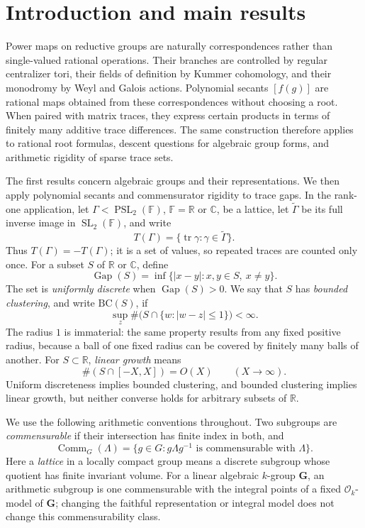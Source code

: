 \documentclass[11pt,reqno]{amsart}
\theoremstyle{definition}
\theoremstyle{remark}
\newcommand{\R}{\mathbb R}
\newcommand{\C}{\mathbb C}
\newcommand{\F}{\mathbb F}
\newcommand{\cO}{\mathcal O}
\newcommand{\Tr}{\operatorname{tr}}
\newcommand{\Gap}{\operatorname{Gap}}
\newcommand{\Comm}{\operatorname{Comm}}
\newcommand{\SL}{\operatorname{SL}}
\newcommand{\PSL}{\operatorname{PSL}}
\newcommand{\BC}{\mathrm{BC}}
\begin{document}
\maketitle
\tableofcontents

\section{Introduction and main results}

Power maps on reductive groups are naturally correspondences rather than
single-valued rational operations.  Their branches are controlled by regular
centralizer tori, their fields of definition by Kummer cohomology, and their
monodromy by Weyl and Galois actions.  Polynomial secants \([f(g)]\) are
rational maps obtained from these correspondences without choosing a root.
When paired with matrix traces, they express certain products in terms of
finitely many additive trace differences.  The same construction therefore
applies to rational root formulas, descent questions for algebraic group
forms, and arithmetic rigidity of sparse trace sets.

The first results concern algebraic groups and their representations.  We
then apply polynomial secants and commensurator rigidity to trace gaps.  In
the rank-one application, let
\(\Gamma<\PSL_2(\F)\), \(\F=\R\) or \(\C\), be a lattice, let
\(\widetilde\Gamma\) be its full inverse image in \(\SL_2(\F)\), and write
\[
 T(\Gamma)=\{\Tr\gamma:\gamma\in\widetilde\Gamma\}.
\]
Thus \(T(\Gamma)=-T(\Gamma)\); it is a set of values, so repeated traces are
counted only once.  For a subset \(S\) of \(\R\) or \(\C\), define
\[
 \Gap(S)=\inf\{|x-y|:x,y\in S,\ x\ne y\}.
\]
The set is \emph{uniformly discrete} when \(\Gap(S)>0\).  We say that
\(S\) has \emph{bounded clustering}, and write \(\BC(S)\), if
\[
 \sup_{z}\#\bigl(S\cap\{w:|w-z|\le1\}\bigr)<\infty.
\]
The radius \(1\) is immaterial: the same property results from any fixed
positive radius, because a ball of one fixed radius can be covered by
finitely many balls of another.  For \(S\subset\R\), \emph{linear growth}
means
\[
 \#(S\cap[-X,X])=O(X)\qquad(X\to\infty).
\]
Uniform discreteness implies bounded clustering, and bounded clustering
implies linear growth, but neither converse holds for arbitrary subsets of
\(\R\).

We use the following arithmetic conventions throughout.  Two subgroups are
\emph{commensurable} if their intersection has finite index in both, and
\[
 \Comm_G(\Lambda)=
 \{g\in G:g\Lambda g^{-1}\text{ is commensurable with }\Lambda\}.
\]
Here a \emph{lattice} in a locally compact group means a discrete subgroup
whose quotient has finite invariant volume.
For a linear algebraic \(k\)-group \(\mathbf G\), an arithmetic subgroup is
one commensurable with the integral points of a fixed \(\cO_k\)-model of
\(\mathbf G\); changing the faithful representation or integral model does
not change this commensurability class.
\end{document}

